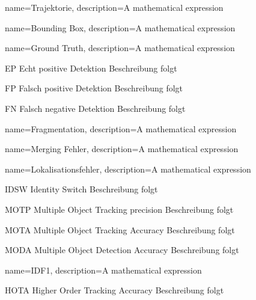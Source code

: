 {
        name=Trajektorie,
        description={A mathematical expression}
}

{
        name=Bounding Box,
        description={A mathematical expression}
}

{
        name=Ground Truth,
        description={A mathematical expression}
}



\newglossaryentrywithacronym
{EP}
{Echt positive Detektion}
{Beschreibung folgt}

\newglossaryentrywithacronym
{FP}
{Falsch positive Detektion}
{Beschreibung folgt}

\newglossaryentrywithacronym
{FN}
{Falsch negative Detektion}
{Beschreibung folgt}

{
        name=Fragmentation,
        description={A mathematical expression}
}

{
        name=Merging Fehler,
        description={A mathematical expression}
}

{
        name=Lokalisationsfehler,
        description={A mathematical expression}
}

\newglossaryentrywithacronym
{IDSW}
{Identity Switch}
{Beschreibung folgt}


\newglossaryentrywithacronym
{MOTP}
{Multiple Object Tracking precision}
{Beschreibung folgt}

\newglossaryentrywithacronym
{MOTA}
{Multiple Object Tracking Accuracy}
{Beschreibung folgt}

\newglossaryentrywithacronym
{MODA}
{Multiple Object Detection Accuracy}
{Beschreibung folgt}

{
        name=IDF1,
        description={A mathematical expression}
}

\newglossaryentrywithacronym
{HOTA}
{Higher Order Tracking Accuracy}
{Beschreibung folgt}

